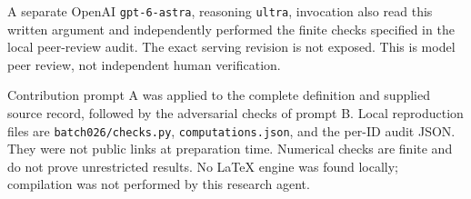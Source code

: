 \documentclass[11pt]{article}
\begin{document}
A separate OpenAI \texttt{gpt-6-astra}, reasoning \texttt{ultra}, invocation also read this written argument and independently performed the finite checks specified in the local peer-review audit. The exact serving revision is not exposed. This is model peer review, not independent human verification.

Contribution prompt A was applied to the complete definition and supplied source record, followed by the adversarial checks of prompt B. Local reproduction files are \texttt{batch026/checks.py}, \texttt{computations.json}, and the per-ID audit JSON. They were not public links at preparation time. Numerical checks are finite and do not prove unrestricted results. No LaTeX engine was found locally; compilation was not performed by this research agent.
\end{document}

